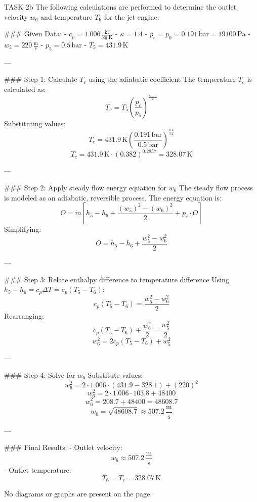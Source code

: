 TASK 2b  
The following calculations are performed to determine the outlet velocity \( w_6 \) and temperature \( T_6 \) for the jet engine:

### Given Data:
- \( c_p = 1.006 \, \frac{\text{kJ}}{\text{kg·K}} \)  
- \( \kappa = 1.4 \)  
- \( p_e = p_0 = 0.191 \, \text{bar} = 19100 \, \text{Pa} \)  
- \( w_5 = 220 \, \frac{\text{m}}{\text{s}} \)  
- \( p_5 = 0.5 \, \text{bar} \)  
- \( T_5 = 431.9 \, \text{K} \)  

---

### Step 1: Calculate \( T_c \) using the adiabatic coefficient  
The temperature \( T_c \) is calculated as:  
\[
T_c = T_5 \left( \frac{p_c}{p_5} \right)^{\frac{\kappa - 1}{\kappa}}
\]  
Substituting values:  
\[
T_c = 431.9 \, \text{K} \left( \frac{0.191 \, \text{bar}}{0.5 \, \text{bar}} \right)^{\frac{0.4}{1.4}}
\]  
\[
T_c = 431.9 \, \text{K} \cdot \left( 0.382 \right)^{0.2857} = 328.07 \, \text{K}
\]  

---

### Step 2: Apply steady flow energy equation for \( w_6 \)  
The steady flow process is modeled as an adiabatic, reversible process. The energy equation is:  
\[
O = \dot{m} \left[ h_5 - h_6 + \frac{(w_5)^2 - (w_6)^2}{2} + p_e \cdot O \right]
\]  
Simplifying:  
\[
O = h_5 - h_6 + \frac{w_5^2 - w_6^2}{2}
\]  

---

### Step 3: Relate enthalpy difference to temperature difference  
Using \( h_5 - h_6 = c_p \Delta T = c_p (T_5 - T_6) \):  
\[
c_p (T_5 - T_6) = \frac{w_5^2 - w_6^2}{2}
\]  
Rearranging:  
\[
c_p (T_5 - T_6) + \frac{w_6^2}{2} = \frac{w_5^2}{2}
\]  
\[
w_6^2 = 2 c_p (T_5 - T_6) + w_5^2
\]  

---

### Step 4: Solve for \( w_6 \)  
Substitute values:  
\[
w_6^2 = 2 \cdot 1.006 \cdot (431.9 - 328.1) + (220)^2
\]  
\[
w_6^2 = 2 \cdot 1.006 \cdot 103.8 + 48400
\]  
\[
w_6^2 = 208.7 + 48400 = 48608.7
\]  
\[
w_6 = \sqrt{48608.7} \approx 507.2 \, \frac{\text{m}}{\text{s}}
\]  

---

### Final Results:
- Outlet velocity:  
\[
w_6 \approx 507.2 \, \frac{\text{m}}{\text{s}}
\]  
- Outlet temperature:  
\[
T_6 = T_c = 328.07 \, \text{K}
\]  

No diagrams or graphs are present on the page.